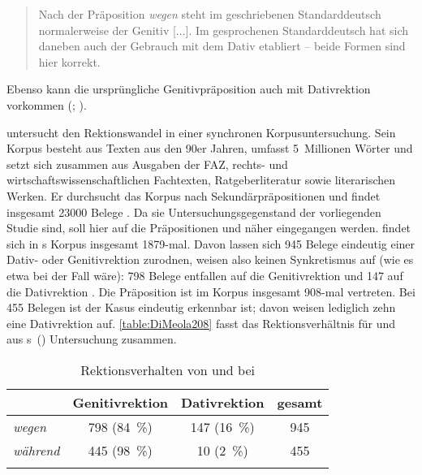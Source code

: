 \begin{quote}
Nach der Pr{\"a}position \textit{wegen }steht im geschriebenen Standarddeutsch normalerweise der Genitiv [...].\textit{ }Im gesprochenen Standarddeutsch hat sich daneben auch der Gebrauch mit dem Dativ etabliert -- beide Formen sind hier korrekt.~\citep[1020--1021]{Duden2016b}
\end{quote}
Ebenso kann die ursprüngliche Genitivpräposition auch mit Dativrektion vorkommen (\citealp[s.][1008]{Duden2016b}; \citealp[{\S}915]{Duden2016}). 

\citet[]{DiMeola2000} untersucht den Rektionswandel in einer synchronen Korpusuntersuchung. 
Sein Korpus besteht aus Texten aus den 90er Jahren, umfasst 5~Millionen Wörter und setzt sich zusammen aus Ausgaben der FAZ, rechts- und wirtschaftswissenschaftlichen Fachtexten, Ratgeberliteratur sowie literarischen Werken. 
Er durchsucht das Korpus nach Sekundärpräpositionen und findet insgesamt 23000 Belege \citep[s.][2]{DiMeola2000}.  
Da sie Untersuchungsgegenstand der vorliegenden Studie sind, soll hier auf die Präpositionen \wegen{} und \waehrend{} näher eingegangen werden. 
 findet sich in \citeauthor{DiMeola2000}s Korpus insgesamt 1879-mal. 
Davon lassen sich 945 Belege eindeutig einer Dativ- oder Genitivrektion zurodnen, weisen also keinen Synkretismus auf (wie es etwa bei  der Fall wäre): 
798 Belege entfallen auf die Genitivrektion und 147 auf die Dativrektion \citep[s.][208]{DiMeola2000}. 
Die Präposition  ist im Korpus insgesamt 908-mal vertreten. Bei 455 Belegen ist der Kasus eindeutig erkennbar ist; davon weisen lediglich zehn eine Dativrektion auf. \autoref{table:DiMeola208} fasst das Rektionsverhältnis für  und  aus \citeauthor{DiMeola2000}s~(\citeyear{DiMeola2000}) Untersuchung zusammen.
\begin{table}
\centering
\begin{tabular}{llll}
\lsptoprule
      & Genitivrektion                 & Dativrektion                   & gesamt                  \\
      \midrule
\textit{wegen}   & \multicolumn{1}{c}{798 (84~\%)} & \multicolumn{1}{c}{147 (16~\%)} & \multicolumn{1}{c}{945} \\
\textit{während} & \multicolumn{1}{c}{445 (98~\%)} & \multicolumn{1}{c}{10 (2~\%)}   & \multicolumn{1}{c}{455} \\
\lspbottomrule
\end{tabular}
\caption{Rektionsverhalten von  und  bei \citet[208]{DiMeola2000}}
\label{table:DiMeola208}
\end{table}

